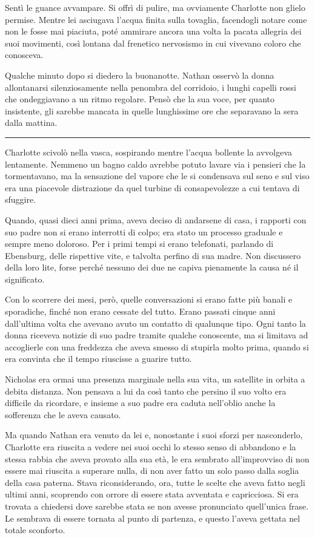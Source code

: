 \documentclass[a4paper,oneside,10pt]{memoir}
\begin{document}
Sentì le guance avvampare. Si offrì di pulire, ma ovviamente Charlotte non glielo permise. Mentre lei asciugava
l'acqua finita sulla tovaglia, facendogli notare come non le fosse mai piaciuta, poté ammirare ancora una volta la
pacata allegria dei suoi movimenti, così lontana dal frenetico nervosismo in cui vivevano coloro che conosceva.

Qualche minuto dopo si diedero la buonanotte. Nathan osservò la donna allontanarsi silenziosamente nella penombra del
corridoio, i lunghi capelli rossi che ondeggiavano a un ritmo regolare. Pensò che la sua voce, per quanto insistente,
gli sarebbe mancata in quelle lunghissime ore che separavano la sera dalla mattina.

\plainbreak{1}

Charlotte scivolò nella vasca, sospirando mentre l'acqua bollente la avvolgeva lentamente. Nemmeno un bagno caldo
avrebbe potuto lavare via i pensieri che la tormentavano, ma la sensazione del vapore che le si condensava sul seno e
sul viso era una piacevole distrazione da quel turbine di consapevolezze a cui tentava di sfuggire.

Quando, quasi dieci anni prima, aveva deciso di andarsene di casa, i rapporti con suo padre non si erano interrotti di
colpo; era stato un processo graduale e sempre meno doloroso. Per i primi tempi si erano telefonati, parlando di
Ebensburg, delle rispettive vite, e talvolta perfino di sua madre. Non discussero della loro lite, forse perché nessuno
dei due ne capiva pienamente la causa né il significato.

Con lo scorrere dei mesi, però, quelle conversazioni si erano fatte più banali e sporadiche, finché non erano cessate
del tutto. Erano passati cinque anni dall'ultima volta che avevano avuto un contatto di qualunque tipo. Ogni tanto la
donna riceveva notizie di suo padre tramite qualche conoscente, ma si limitava ad accoglierle con una freddezza che
aveva smesso di stupirla molto prima, quando si era convinta che il tempo riuscisse a guarire tutto.

Nicholas era ormai una presenza marginale nella sua vita, un satellite in orbita a debita distanza. Non pensava a lui da
così tanto che persino il suo volto era difficile da ricordare, e insieme a suo padre era caduta nell'oblio anche la
sofferenza che le aveva causato.

Ma quando Nathan era venuto da lei e, nonostante i suoi sforzi per nasconderlo, Charlotte era riuscita a vedere nei suoi
occhi lo stesso senso di abbandono e la stessa rabbia che aveva provato alla sua età, le era sembrato all'improvviso di
non essere mai riuscita a superare nulla, di non aver fatto un solo passo dalla soglia della casa paterna. Stava
riconsiderando, ora, tutte le scelte che aveva fatto negli ultimi anni, scoprendo con orrore di essere stata avventata e
capricciosa. Si era trovata a chiedersi dove sarebbe stata se non avesse pronunciato quell'unica frase. Le sembrava di
essere tornata al punto di partenza, e questo l'aveva gettata nel totale sconforto.
\end{document}
